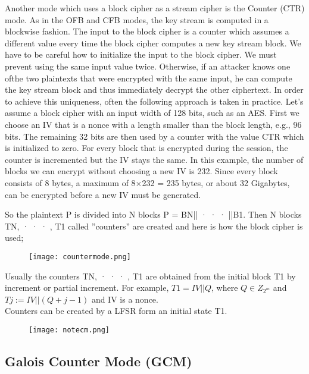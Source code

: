 \documentclass{article}
\begin{document}
Another mode which uses a block cipher as a stream cipher is the Counter (CTR)
mode. As in the OFB and CFB modes, the key stream is computed in a blockwise
fashion. The input to the block cipher is a counter which assumes a different value
every time the block cipher computes a new key stream block.
We have to be careful how to initialize the input to the block cipher. We must
prevent using the same input value twice. Otherwise, if an attacker knows one ofthe two plaintexts that were encrypted with the same input, he can compute the key
stream block and thus immediately decrypt the other ciphertext. In order to achieve
this uniqueness, often the following approach is taken in practice. Let’s assume a
block cipher with an input width of 128 bits, such as an AES. First we choose
an IV that is a nonce with a length smaller than the block length, e.g., 96 bits.
The remaining 32 bits are then used by a counter with the value CTR which is
initialized to zero. For every block that is encrypted during the session, the counter
is incremented but the IV stays the same. In this example, the number of blocks we
can encrypt without choosing a new IV is 232. Since every block consists of 8 bytes,
a maximum of 8×232 = 235 bytes, or about 32 Gigabytes, can be encrypted before
a new IV must be generated.

\vspace{1cm}
So the plaintext P is divided into N blocks P = BN|| · · · ||B1. Then N blocks TN, · · · , T1 called ”counters” are created and here is how the block cipher is used;

\begin{figure}[htp]
    \centering
    \texttt{[image: countermode.png]}
\end{figure}

Usually the counters TN, · · · , T1 are obtained from the initial block T1 by increment or partial
increment. For example, $T1 = IV ||Q$, where $Q \in Z_{2^m}$ and $Tj := IV ||(Q + {j - 1})$ and IV is a nonce.\\

Counters can be created by a LFSR form an initial state T1.

\begin{figure}[htp]
    \centering
    \texttt{[image: notecm.png]}
\end{figure}

\subsection{Galois Counter Mode (GCM)}
\end{document}
